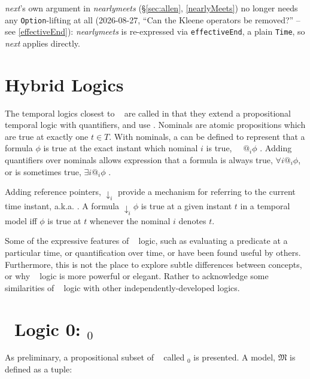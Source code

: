 \pn \textit{next}'s own argument in \textit{nearlymeets} (\S\ref{sec:allen}, \ref{nearlyMeets}) no longer needs
any \texttt{Option}-lifting at all (2026-08-27, ``Can the Kleene operators be removed?'' -- see
\ref{effectiveEnd}): \textit{nearlymeets} is re-expressed via \texttt{effectiveEnd}, a plain \texttt{Time},
so \textit{next} applies directly.

\section{Hybrid Logics}\label{sec:hybridlogics}

\pn The temporal logics closest to \logicid~ are called  in that they extend a propositional temporal logic with quantifiers, and use  \cite{sep-logic-hybrid}\cite{Bull-1970}.  Nominals are atomic propositions which are true at exactly one $t \in T$.  With nominals, a  can be defined to represent that a formula $\phi$ is true at the exact instant which nominal $i$ is true,~~ $@_i \phi$
 \cite{Alur94areally}.  Adding quantifiers over nominals allows expression that a formula is always true, $\forall i @_i \phi$, or is sometimes true, $\exists i @_i \phi$ \cite{Passy-Tinchev1985}.  
 
\pn  Adding reference pointers, $\downarrow_i$ provide a mechanism for referring to the current time instant, a.k.a.  \cite{Goranko1996}.  A formula $\downarrow_i \phi$ is true at a given instant $t$ in a temporal model iff $\phi$ is true at $t$ whenever the nominal $i$ denotes $t$. 
 
\pn  Some of the expressive features of \lang~ logic, such as evaluating a predicate at a particular time, or quantification over time, or  have been found useful by others.  Furthermore, this is not the place to explore subtle differences between concepts, or why \lang~ logic is more powerful or elegant.  %
 Rather to acknowledge some similarities of \lang~ logic with other independently-developed logics.
 
 \section{\logicid~Logic 0:  \logicid$_0$}\label{sec:bl0}
 
\pn  As preliminary, a propositional subset of \logicid~ called \logicid$_0$ is presented.  A model, $\mathfrak{M}$ is defined as a tuple:
 
